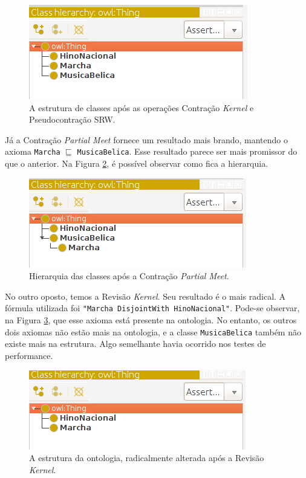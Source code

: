 \begin{figure}[H]
	\centering
	\includegraphics[width=0.5\linewidth]{Capitulos/Testes/compckhino}
	\caption{A estrutura de classes após as operações Contração \textit{Kernel} e Pseudocontração SRW.}
	\label{fig:compckhino}
\end{figure}

Já a Contração \textit{Partial Meet} fornece um resultado mais brando, mantendo o axioma \texttt{Marcha} $ \sqsubseteq $ \texttt{MusicaBelica}. Esse resultado parece ser mais promissor do que o anterior. Na Figura \ref{fig:compcpmhino}, é possível observar como fica a hierarquia.

\begin{figure}[H]
	\centering
	\includegraphics[width=0.5\linewidth]{Capitulos/Testes/compcpmhino}
	\caption{Hierarquia das classes após a Contração \textit{Partial Meet}.}
	\label{fig:compcpmhino}
\end{figure}

No outro oposto, temos a Revisão \textit{Kernel}. Seu resultado é o mais radical. A fórmula utilizada foi \texttt{"Marcha DisjointWith HinoNacional"}. Pode-se observar, na Figura \ref{fig:comprkhino}, que esse axioma está presente na ontologia. No entanto, os outros dois axiomas não estão mais na ontologia, e a classe \texttt{MusicaBelica} também não existe mais na estrutura. Algo semelhante havia ocorrido nos testes de performance.

\begin{figure}[H]
	\centering
	\includegraphics[width=0.5\linewidth]{Capitulos/Testes/comprkhino}
	\caption{A estrutura da ontologia, radicalmente alterada após a Revisão \textit{Kernel}.}
	\label{fig:comprkhino}
\end{figure}
